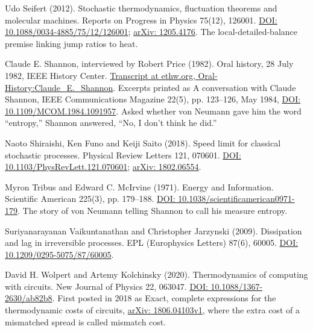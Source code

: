 \documentclass[11pt,twoside]{article}
\theoremstyle{thielethm}
\theoremstyle{thieledef}
\theoremstyle{thieledef}
\theoremstyle{thieledef}
\theoremstyle{thielethm}
\theoremstyle{thieleobs}
\theoremstyle{thielethm}
\begin{document}
\noindent Udo Seifert (2012). Stochastic thermodynamics, fluctuation theorems and molecular machines. Reports on Progress in Physics 75(12), 126001. \href{https://doi.org/10.1088/0034-4885/75/12/126001}{DOI: 10.1088/0034-4885/75/12/126001}; \href{https://arxiv.org/abs/1205.4176}{arXiv: 1205.4176}. The local-detailed-balance premise linking jump ratios to heat.
\par\medskip

\noindent Claude E. Shannon, interviewed by Robert Price (1982). Oral history, 28 July 1982, IEEE History Center. \href{https://ethw.org/Oral-History:Claude_E._Shannon}{Transcript at ethw.org, Oral-History:Claude\_E.\_Shannon}. Excerpts printed as A conversation with Claude Shannon, IEEE Communications Magazine 22(5), pp. 123--126, May 1984, \href{https://doi.org/10.1109/MCOM.1984.1091957}{DOI: 10.1109/MCOM.1984.1091957}. Asked whether von Neumann gave him the word ``entropy,'' Shannon answered, ``No, I don't think he did.''
\par\medskip

\noindent Naoto Shiraishi, Ken Funo and Keiji Saito (2018). Speed limit for classical stochastic processes. Physical Review Letters 121, 070601. \href{https://doi.org/10.1103/PhysRevLett.121.070601}{DOI: 10.1103/PhysRevLett.121.070601}; \href{https://arxiv.org/abs/1802.06554}{arXiv: 1802.06554}.
\par\medskip

\noindent Myron Tribus and Edward C. McIrvine (1971). Energy and Information. Scientific American 225(3), pp. 179--188. \href{https://doi.org/10.1038/scientificamerican0971-179}{DOI: 10.1038/scientificamerican0971-179}. The story of von Neumann telling Shannon to call his measure entropy.
\par\medskip

\noindent Suriyanarayanan Vaikuntanathan and Christopher Jarzynski (2009). Dissipation and lag in irreversible processes. EPL (Europhysics Letters) 87(6), 60005. \href{https://doi.org/10.1209/0295-5075/87/60005}{DOI: 10.1209/0295-5075/87/60005}.
\par\medskip

\noindent David H. Wolpert and Artemy Kolchinsky (2020). Thermodynamics of computing with circuits. New Journal of Physics 22, 063047. \href{https://doi.org/10.1088/1367-2630/ab82b8}{DOI: 10.1088/1367-2630/ab82b8}. First posted in 2018 as Exact, complete expressions for the thermodynamic costs of circuits, \href{https://arxiv.org/abs/1806.04103v1}{arXiv: 1806.04103v1}, where the extra cost of a mismatched spread is called mismatch cost.
\par\medskip
\end{document}
